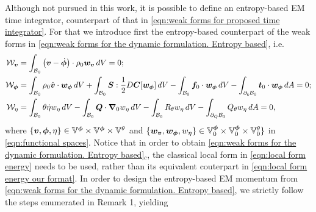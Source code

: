

Although not pursued in this work, it is possible to define an entropy-based EM time integrator, counterpart of that in \eqref{eqn:weak forms for proposed time integrator}. For that we introduce first the entropy-based counterpart of the weak forms in \eqref{eqn:weak forms for the dynamic formulation. Entropy based}, i.e. 
%
\begin{equation}\label{eqn:weak forms for the dynamic formulation. Entropy based}
\begin{aligned}
\mathcal{W}_{\vect{v}}&= \int_{\mathcal{B}_0}\left(\vect{v} - \dot{\vect{\phi}}\right)\cdot\rho_0\vect{w}_{\vect{v}}\,dV=0;\\
%
\mathcal{W}_{\vect{\phi}} &  = \int_{\mathcal{B}_0}\rho_0\dot{\vect{v}}\cdot\vect{w}_{\vect{\phi}}\,dV + \int_{\mathcal{B}_0}\vect{S}:\frac{1}{2}D\vect{C}[\vect{w}_{\vect{\phi}}]\,dV\-  -\int_{\mathcal{B}_0}\vect{f}_0\cdot\vect{w}_{\vect{\phi}}\,dV-
\int_{\partial_{\boldsymbol{t}}\mathcal{B}_0}\vect{t}_0\cdot\vect{w}_{\vect{\phi}}\,dA=0;\\
%
\mathcal{W}_{{\eta}}& =   \int_{\mathcal{B}_0}{\theta}\dot{\eta} w_{\eta}\,dV - \int_{\mathcal{B}_0}\vect{Q}\cdot\vect{\nabla}_0w_{\eta}\,dV - \int_{\mathcal{B}_0}R_{\theta}{w}_{\eta}\,dV - \int_{\partial_{Q}\mathcal{B}_{0}}Q_{\theta}w_{\eta}\,dA=0,
%
\end{aligned}
\end{equation}
%
where
$\{\boldsymbol{v},\boldsymbol{\phi},\eta\}\in \mathbb{V}^{\boldsymbol{\phi}}\times\mathbb{V}^{\boldsymbol{\phi}}\times\mathbb{V}^{\theta}$ and  $\{\boldsymbol{w}_{\boldsymbol{v}},\boldsymbol{w}_{\boldsymbol{\phi}},{w}_{\eta}\}\in \mathbb{V}_0^{\boldsymbol{\phi}}\times\mathbb{V}_0^{\boldsymbol{\phi}}\times\mathbb{V}_0^{\theta}
\}$ in \eqref{eqn:functional spaces}. Notice that in order to obtain \eqref{eqn:weak forms for the dynamic formulation. Entropy based}$_c$, the classical local form in \eqref{eqn:local form energy} needs to be used, rather than its equivalent couterpart in \eqref{eqn:local form energy our format}. In order to design the entropy-based EM momentum from \eqref{eqn:weak forms for the dynamic formulation. Entropy based}, we strictly follow the steps enumerated in Remark 1, yielding 
%
